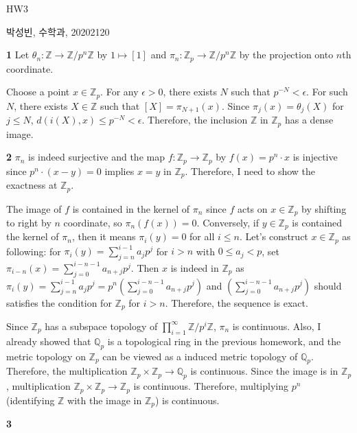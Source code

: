 \documentclass[a4paper, 12pt]{article}
\theoremstyle{Mydefinition}
\theoremstyle{Mytheorem}
\begin{document}
\thispagestyle{myfirstpage}
\begin{center}
	\Large{HW3}
\end{center}
박성빈, 수학과, 20202120

\noindent \textbf{1}
Let $\theta_n:\mathbb{Z}\rightarrow \mathbb{Z}/p^n\mathbb{Z}$ by $1\mapsto [1]$ and $\pi_n:\mathbb{Z}_p\rightarrow \mathbb{Z}/p^n\mathbb{Z}$ by the projection onto $n$th coordinate.

Choose a point $x\in \mathbb{Z}_p$. For any $\epsilon>0$, there exists $N$ such that $p^{-N}<\epsilon$. For such $N$, there exists $X\in\mathbb{Z}$ such that $[X] = \pi_{N+1}(x)$. Since $\pi_j(x) = \theta_j(X)$ for $j\leq N$, $d(i(X), x)\leq p^{-N}<\epsilon$. Therefore, the inclusion $\mathbb{Z}$ in $\mathbb{Z}_p$ has a dense image.

\noindent \textbf{2}
$\pi_n$ is indeed surjective and the map $f:\mathbb{Z}_p\rightarrow\mathbb{Z}_p$ by $f(x) = p^n\cdot x$ is injective since $p^n\cdot(x-y) = 0$ implies $x=y$ in $\mathbb{Z}_p$. Therefore, I need to show the exactness at $\mathbb{Z}_p$.

The image of $f$ is contained in the kernel of $\pi_n$ since $f$ acts on $x\in\mathbb{Z}_p$ by shifting to right by $n$ coordinate, so $\pi_n(f(x)) = 0$. Conversely, if $y\in\mathbb{Z}_p$ is contained the kernel of $\pi_n$, then it means $\pi_i(y) = 0$ for all $i\leq n$. Let's construct $x\in \mathbb{Z}_p$ as following: for $\pi_i(y) = \sum_{j=n}^{i-1} a_j p^j$ for $i> n$ with $0\leq a_j<p$, set $\pi_{i-n}(x) = \sum_{j=0}^{i-n-1} a_{n+j} p^j$. Then $x$ is indeed in $\mathbb{Z}_p$ as $\pi_i(y) = \sum_{j=n}^{i-1} a_j p^j = p^n\left(\sum_{j=0}^{i-n-1} a_{n+j} p^j\right)$ and $\left(\sum_{j=0}^{i-n-1} a_{n+j} p^j\right)$ should satisfies the condition for $\mathbb{Z}_p$ for $i>n$. Therefore, the sequence is exact.

Since $\mathbb{Z}_p$ has a subspace topology of $\prod_{i=1}^\infty \mathbb{Z}/p^i\mathbb{Z}$, $\pi_n$ is continuous. Also, I already showed that $\mathbb{Q}_p$ is a topological ring in the previous homework, and the metric topology on $\mathbb{Z}_p$ can be viewed as a induced metric topology of $\mathbb{Q}_p$. Therefore, the multiplication $\mathbb{Z}_p\times\mathbb{Z}_p\rightarrow\mathbb{Q}_p$ is continuous. Since the image is in $\mathbb{Z}_p$, multiplication $\mathbb{Z}_p\times\mathbb{Z}_p\rightarrow\mathbb{Z}_p$ is continuous. Therefore, multiplying $p^n$ (identifying $\mathbb{Z}$ with the image in $\mathbb{Z}_p$) is continuous.

\noindent \textbf{3}
\end{document}
